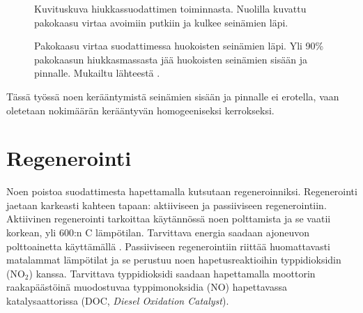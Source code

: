 \begin{figure}[H]
    \centering 
               {Kuvituskuva hiukkassuodattimen toiminnasta. Nuolilla kuvattu pakokaasu virtaa avoimiin putkiin ja kulkee seinämien läpi.}
    \caption{Pakokaasu virtaa suodattimessa huokoisten seinämien läpi. Yli 90\% pakokaasun hiukkasmassasta jää huokoisten seinämien sisään ja pinnalle. Mukailtu lähteestä \cite{dieselnet_dpf}.}
    \label{fig:wall-flow-dpf}
\end{figure}

Tässä työssä noen kerääntymistä seinämien sisään ja pinnalle ei erotella, vaan oletetaan nokimäärän kerääntyvän homogeeniseksi kerrokseksi.


\section{Regenerointi}
Noen poistoa suodattimesta hapettamalla kutsutaan regeneroinniksi. Regenerointi jaetaan karkeasti kahteen tapaan: aktiiviseen ja passiiviseen regenerointiin. 
Aktiivinen regenerointi tarkoittaa käytännössä noen polttamista ja se
vaatii korkean, yli 600:n \degree C lämpötilan. Tarvittava energia saadaan ajoneuvon polttoainetta käyttämällä \cite{dieselnet_dpf}. Passiiviseen regenerointiin riittää huomattavasti matalammat lämpötilat ja se perustuu noen hapetusreaktioihin typpidioksidin (NO\(_2\)) kanssa. Tarvittava typpidioksidi saadaan hapettamalla moottorin raakapäästöinä muodostuvaa typpimonoksidia (NO) hapettavassa katalysaattorissa (DOC, \emph{Diesel Oxidation Catalyst}).

